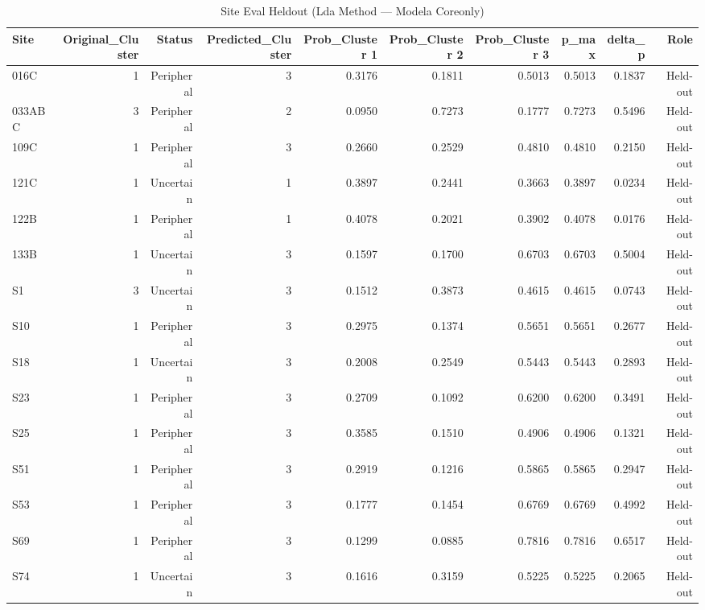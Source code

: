 \begin{table}[htbp]
  \centering
  \caption{Site Eval Heldout (Lda Method — Modela Coreonly)}
  \label{tab:LDA_Method_ModelA_CoreOnly_tables_site_eval_heldout}
  \small
  \begin{tabular}{lrrrrrrrrr}
    \toprule
    Site & Original\_Cluster & Status & Predicted\_Cluster & Prob\_Cluster 1 & Prob\_Cluster 2 & Prob\_Cluster 3 & p\_max & delta\_p & Role \\
    \midrule
    016C & 1 & Peripheral & 3 & 0.3176 & 0.1811 & 0.5013 & 0.5013 & 0.1837 & Held-out \\
    033ABC & 3 & Peripheral & 2 & 0.0950 & 0.7273 & 0.1777 & 0.7273 & 0.5496 & Held-out \\
    109C & 1 & Peripheral & 3 & 0.2660 & 0.2529 & 0.4810 & 0.4810 & 0.2150 & Held-out \\
    121C & 1 & Uncertain & 1 & 0.3897 & 0.2441 & 0.3663 & 0.3897 & 0.0234 & Held-out \\
    122B & 1 & Peripheral & 1 & 0.4078 & 0.2021 & 0.3902 & 0.4078 & 0.0176 & Held-out \\
    133B & 1 & Uncertain & 3 & 0.1597 & 0.1700 & 0.6703 & 0.6703 & 0.5004 & Held-out \\
    S1 & 3 & Uncertain & 3 & 0.1512 & 0.3873 & 0.4615 & 0.4615 & 0.0743 & Held-out \\
    S10 & 1 & Peripheral & 3 & 0.2975 & 0.1374 & 0.5651 & 0.5651 & 0.2677 & Held-out \\
    S18 & 1 & Uncertain & 3 & 0.2008 & 0.2549 & 0.5443 & 0.5443 & 0.2893 & Held-out \\
    S23 & 1 & Peripheral & 3 & 0.2709 & 0.1092 & 0.6200 & 0.6200 & 0.3491 & Held-out \\
    S25 & 1 & Peripheral & 3 & 0.3585 & 0.1510 & 0.4906 & 0.4906 & 0.1321 & Held-out \\
    S51 & 1 & Peripheral & 3 & 0.2919 & 0.1216 & 0.5865 & 0.5865 & 0.2947 & Held-out \\
    S53 & 1 & Peripheral & 3 & 0.1777 & 0.1454 & 0.6769 & 0.6769 & 0.4992 & Held-out \\
    S69 & 1 & Peripheral & 3 & 0.1299 & 0.0885 & 0.7816 & 0.7816 & 0.6517 & Held-out \\
    S74 & 1 & Uncertain & 3 & 0.1616 & 0.3159 & 0.5225 & 0.5225 & 0.2065 & Held-out \\
    \bottomrule
  \end{tabular}
\end{table}
